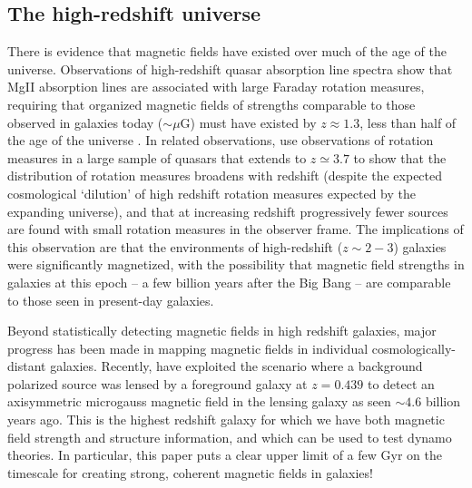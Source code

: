 \vspace{-3mm}
\subsection{The high-redshift universe}
\label{sec:extragalactic}
\vspace{-2mm}

There is evidence that magnetic fields have existed
over much of the age of the universe.  Observations of high-redshift
quasar absorption line spectra show that MgII absorption lines are
associated with large Faraday rotation measures, requiring that
organized magnetic fields of strengths comparable to those observed in
galaxies today ($\sim \mu$G) must have existed by $z \approx 1.3$,
less than half of the age of the universe \cite{2008Natur.454..302B, Joshi13,
Farnes14}.  In related observations, \cite{2008ApJ...676...70K} use
observations of rotation measures in a large sample of quasars that
extends to $z \simeq 3.7$ to show that the distribution of rotation
measures broadens with redshift (despite the expected cosmological
`dilution' of high redshift rotation measures expected by the
expanding universe), and that at increasing redshift progressively
fewer sources are found with small rotation measures in the observer
frame.  The implications of this observation are that the environments
of high-redshift ($z \sim 2-3$) galaxies were significantly
magnetized, with the possibility that magnetic field strengths in
galaxies at this epoch -- a few billion years after the Big Bang --
are comparable to those seen in present-day galaxies.  

Beyond statistically detecting magnetic fields in high redshift
galaxies, major progress has been made in mapping magnetic fields in
individual cosmologically-distant galaxies. Recently, 
\citet{Mao17} have exploited the scenario where a background
polarized source was lensed by a foreground galaxy at $z=0.439$ to
detect an axisymmetric microgauss magnetic field in the lensing galaxy
as seen $\sim 4.6$ billion years ago.  This is the highest redshift
galaxy for which we have both magnetic field strength and structure
information, and which can be used to test dynamo theories.  In
particular, this paper puts a clear upper limit of a few Gyr on the
timescale for creating strong, coherent magnetic fields in galaxies!


